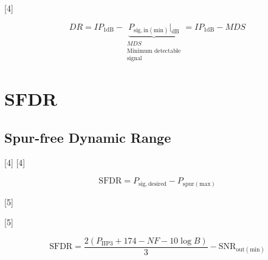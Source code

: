 \documentclass[11pt,a4paper]{article}
\begin{document}
[4]

\[ DR = IP_{1\mathrm{dB}} - \underbrace{P_{\mathrm{sig,in(min)}}\Big|_{\mathrm{dB}}}_{\substack{MDS\\ \text{Minimum detectable}\\ \text{signal}}} = IP_{1\mathrm{dB}} - MDS \]

\section{SFDR}
\subsection{Spur-free Dynamic Range}

[4]
[4]

\[ \mathrm{SFDR} = P_{\mathrm{sig,desired}} - P_{\mathrm{spur(max)}} \]

[5]

[5]

\[ \mathrm{SFDR} = \frac{2\left(P_{\mathrm{IIP3}} + 174 - NF - 10\log B\right)}{3} - \mathrm{SNR}_{\mathrm{out(min)}} \]
\end{document}
